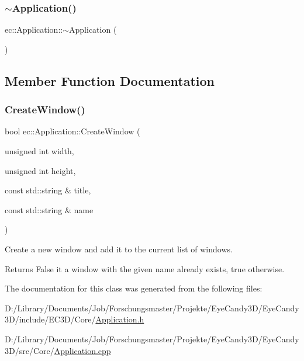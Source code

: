 \subsubsection{\texorpdfstring{$\sim$\+Application()}{~Application()}}
{\footnotesize\ttfamily ec\+::\+Application\+::$\sim$\+Application (\begin{DoxyParamCaption}{ }\end{DoxyParamCaption})}



\subsection{Member Function Documentation}
\mbox{\label{classec_1_1_application_ae542514441629578de091652e0153359}} 
\subsubsection{\texorpdfstring{Create\+Window()}{CreateWindow()}}
{\footnotesize\ttfamily bool ec\+::\+Application\+::\+Create\+Window (\begin{DoxyParamCaption}\item[{unsigned int}]{width,  }\item[{unsigned int}]{height,  }\item[{const std\+::string \&}]{title,  }\item[{const std\+::string \&}]{name }\end{DoxyParamCaption})}

Create a new window and add it to the current list of windows. \begin{DoxyReturn}{Returns}
False it a window with the given name already exists, true otherwise. 
\end{DoxyReturn}


The documentation for this class was generated from the following files\+:\begin{DoxyCompactItemize}
\item 
D\+:/\+Library/\+Documents/\+Job/\+Forschungsmaster/\+Projekte/\+Eye\+Candy3\+D/\+Eye\+Candy3\+D/include/\+E\+C3\+D/\+Core/\mbox{\hyperlink{_application_8h}{Application.\+h}}\item 
D\+:/\+Library/\+Documents/\+Job/\+Forschungsmaster/\+Projekte/\+Eye\+Candy3\+D/\+Eye\+Candy3\+D/src/\+Core/\mbox{\hyperlink{_application_8cpp}{Application.\+cpp}}\end{DoxyCompactItemize}
